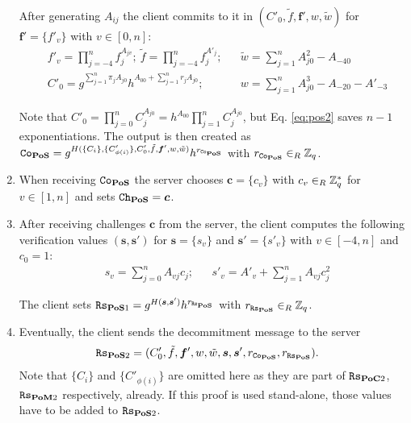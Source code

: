 \begin{enumerate}
    \noindent
    After generating $A_{ij}$ the client commits to it in $(C'_0, \tilde{f}, \bm f', w, \tilde{w})$ for $\bm f'=\{f'_v\}$ with $v\in[0,n]$:
    \begin{align}
    & f'_v=\prod_{j=-4}^{n} f_j^{A_{jv}};~ \tilde{f}=\prod_{j=-4}^{n} f_j^{A'_{j}}; && \tilde{w}=\sum_{j=1}^n A_{j0}^2 - A_{-40} \nonumber\\
    & C'_0=g^{\sum_{j=1}^{n} \pi_j A_{j0}} h^{A_{00}+\sum_{j=1}^{n} r_jA_{j0}}; && w=\sum_{j=1}^n A_{j0}^3-A_{-20}-A'_{-3} \label{eq:pos2}
    \end{align}

    \noindent
    Note that $C'_0=\prod_{j=0}^n C_j^{A_{j0}}=h^{A_{00}}\prod_{j=1}^n C_j^{A_{j0}}$, but Eq. \ref{eq:pos2} saves $n-1$ exponentiations.
    The output is then created as
    $\mathtt{Co}_\mathsf{\bf PoS}=g^{H(\{C_i\}, \{C'_{\phi(i)}\}, C'_0, \tilde{f}, \bm f', w, \tilde{w})} h^{r_{\mathtt{Co}_\mathsf{\bf PoS}}}$ with $r_{\mathtt{Co}_\mathsf{\bf PoS}}\in_R\mathbb{Z}_q$.

\item %
    When receiving $\mathtt{Co}_\mathsf{\bf PoS}$ the server chooses $\bm c = \{c_v\}$ with $c_v\in_R\mathbb{Z}^\ast_q$ for $v\in[1,n]$ and sets $\mathtt{Ch}_\mathsf{\bf PoS}=\bm c$.

\item %
    After receiving challenges $\bm c$ from the server, the client computes the following verification values $(\bm s, \bm s')$ for $\bm s = \{s_v\}$ and $\bm s' = \{s'_v\}$ with $v\in[-4,n]$ and $c_0=1$:
    \begin{align*}
     & s_v = \sum_{j=0}^{n} A_{vj}c_j; && s'_v = A'_v + \sum_{j=1}^{n} A_{vj}c_j^2
    \end{align*}

    \noindent
    The client sets $\mathtt{Rs}_{\mathsf{\bf PoS}1}=g^{H(\bm s, \bm s')} h^{r_{\mathtt{Rs}_\mathsf{\bf PoS}}}$ with $r_{\mathtt{Rs}_\mathsf{\bf PoS}}\in_R\mathbb{Z}_q$.

\item %
    Eventually, the client sends the decommitment message to the server
    \begin{align*}
      & \mathtt{Rs}_{\mathsf{\bf PoS}2}=(C'_0, \tilde{f}, \bm f', w, \tilde{w}, \bm s, \bm s', r_{\mathtt{Co}_\mathsf{\bf PoS}}, r_{\mathtt{Rs}_\mathsf{\bf PoS}}).
    \end{align*}
    Note that $\{C_i\}$ and $\{C'_{\phi(i)}\}$ are omitted here as they are part of $\mathtt{Rs}_{\mathsf{\bf PoC}2}$, $\mathtt{Rs}_{\mathsf{\bf PoM}2}$ respectively, already.
    If this proof is used stand-alone, those values have to be added to $\mathtt{Rs}_{\mathsf{\bf PoS}2}$.

\end{enumerate}

